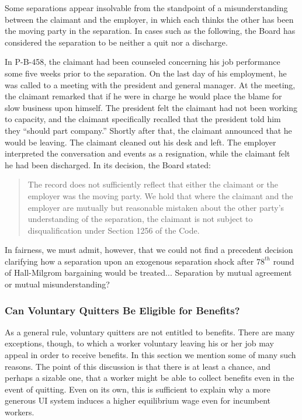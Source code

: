 \documentclass[12pt]{article}
\newcommand{\1}{\mathbf{1}}
\begin{document}
\begin{appendix}
Some separations appear insolvable from the standpoint of a misunderstanding between the claimant and the employer, in which each thinks the other has been the moving party in the separation. In cases such as the following, the Board has considered the separation to be neither a quit nor a discharge.

In P-B-458, the claimant had been counseled concerning his job performance some five weeks prior to the separation. On the last day of his employment, he was called to a meeting with the president and general manager. At the meeting, the claimant remarked that if he were in charge he would place the blame for slow business upon himself. The president felt the claimant had not been working to capacity, and the claimant specifically recalled that the president told him they ``should part company.'' Shortly after that, the claimant announced that he would be leaving. The claimant cleaned out his desk and left. The employer interpreted the conversation and events as a resignation, while the claimant felt he had been discharged. In its decision, the Board stated:
\begin{quotation}
The record does not sufficiently reflect that either the claimant or the employer was the moving party. We hold that where the claimant and the employer are mutually but reasonable mistaken about the other party's understanding of the separation, the claimant is not subject to disqualification under Section 1256 of the Code.
\end{quotation}

 In fairness, we must admit, however, that we could not find a precedent decision clarifying how a separation upon an exogenous separation shock after $78^{th}$ round of Hall-Milgrom bargaining would be treated... Separation by mutual agreement or mutual misunderstanding?



\subsubsection{Can Voluntary Quitters Be Eligible for Benefits?}
\label{app:eligible_quitters}

As a general rule, voluntary quitters are not entitled to benefits. There are many exceptions, though, to which a worker voluntary leaving his or her job may appeal in order to receive benefits. In this section we mention some of many such reasons. The point of this discussion is that there is at least a chance, and perhaps a sizable one, that a worker might be able to collect benefits even in the event of quitting. Even on its own, this is sufficient to explain why a more generous UI system induces a higher equilibrium wage even for incumbent workers.


\end{appendix}
\end{document}
